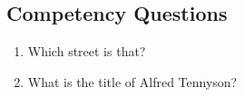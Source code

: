 \subsection{Competency Questions}
\label{cqs:Stubs}
\begin{enumerate}[CQ1.]
\item Which street is that?
\item What is the title of Alfred Tennyson?
\end{enumerate}

\newpage
